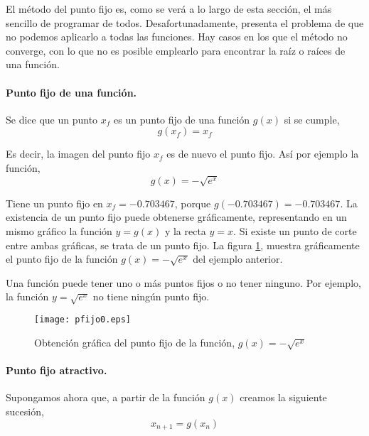 El método del punto fijo es, como se verá a lo largo de esta sección, el más sencillo de programar de todos. Desafortunadamente, presenta el problema de que no podemos aplicarlo a todas las funciones. Hay casos en los que el método no converge, con lo que no es posible emplearlo para encontrar la raíz o raíces de una función.
 
\paragraph{Punto fijo de una función.} Se dice que un punto $x_f$ es un punto fijo de una función $g(x)$ si se cumple,
\begin{equation*}
g(x_f)=x_f
\end{equation*}

Es decir, la imagen del punto fijo $x_f$ es de nuevo el punto fijo. Así por ejemplo la función,
\begin{equation*}
g(x)=-\sqrt{e^x}
\end{equation*}

Tiene un punto fijo en $x_f=-0.703467$, porque $g(-0.703467)=-0.703467$. La existencia de un punto fijo puede obtenerse gráficamente, representando en un mismo gráfico la función $y=g(x)$ y la recta $y=x$. Si existe un punto de corte entre ambas gráficas, se trata de un punto fijo.  La figura \ref{fig:pfijo0}, muestra gráficamente el punto fijo de la función $g(x)=-\sqrt{e^x}$ del ejemplo anterior.

Una función puede tener uno o más puntos fijos o no tener ninguno. Por ejemplo, la función $y=\sqrt{e^x}$ no tiene ningún punto fijo.


\begin{figure}[h]
\texttt{[image: pfijo0.eps]}
\caption{Obtención gráfica del punto fijo de la función, $g(x)=-\sqrt{e^x}$}
\label{fig:pfijo0}
\end{figure}

\paragraph{Punto fijo atractivo.} Supongamos ahora que, a partir de la función $g(x)$ creamos la siguiente sucesión,
\begin{equation*}
x_{n+1}=g(x_n)
\end{equation*}

